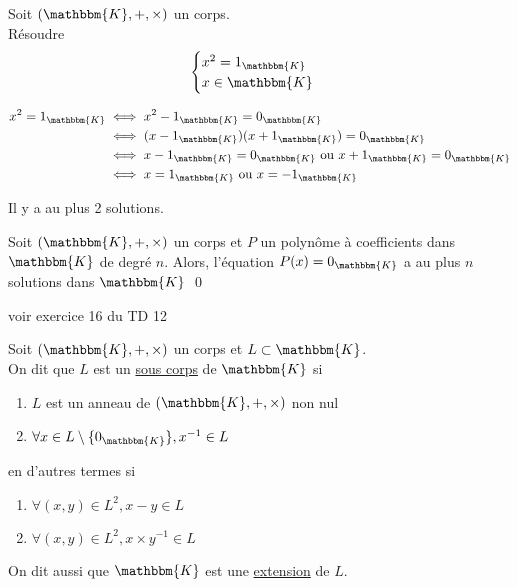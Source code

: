 \begin{exm}
	Soit $(\mathbbm{K},+,\times)$ un corps.\\
	Résoudre \[
		\begin{cases}
			x^2 = 1_\mathbbm{K}\\
			x \in \mathbbm{K}
		\end{cases}
	\]

	\begin{align*}
		x^2 = 1_\mathbbm{K} &\iff x^2 - 1_\mathbbm{K} = 0_\mathbbm{K}\\
		&\iff (x - 1_\mathbbm{K})(x+1_\mathbbm{K}) = 0_\mathbbm{K}\\
		&\iff x - 1_\mathbbm{K} = 0_\mathbbm{K} \text{ ou } x + 1_\mathbbm{K} = 0_\mathbbm{K}\\
		&\iff x = 1_\mathbbm{K} \text{ ou } x = -1_\mathbbm{K}
	\end{align*}

	Il y a au plus 2 solutions.
\end{exm}

\begin{prop}
	Soit $(\mathbbm{K},+,\times )$ un corps et $P$ un polynôme à coefficients dans $\mathbbm{K}$ de degré $n$. Alors, l'équation $P(x) = 0_{\mathbbm{K}}$ a au plus $n$ solutions dans $\mathbbm{K}$ 
	\qed
\end{prop}

\begin{crlr}
	voir exercice 16 du TD 12
\end{crlr}


\begin{defn}
	Soit $(\mathbbm{K}, +, \times)$ un corps et $L\subset \mathbbm{K}$.\\
	On dit que $L$ est un \underline{sous corps} de $\mathbbm{K}$ si
	\begin{enumerate}
		\item $L$ est un anneau de $(\mathbbm{K}, +, \times)$ non nul
		\item $\forall x \in L\setminus \{0_\mathbbm{K}\}, x^{-1} \in L$ 
	\end{enumerate}
	\vspace{2mm}
	en d'autres termes si
	\begin{enumerate}
		\item $\forall (x,y) \in L^2, x - y \in L$
		\item $\forall (x,y) \in L^2, x \times y^{-1} \in L$
	\end{enumerate}
	\vspace{5mm}
	On dit aussi que $\mathbbm{K}$ est une \underline{extension} de $L$.
\end{defn}

